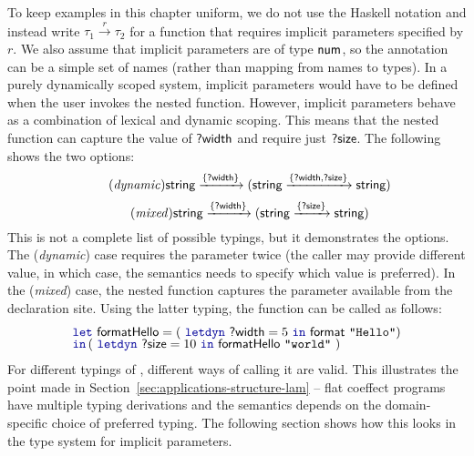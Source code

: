 To keep examples in this chapter uniform, we do not use the Haskell notation and instead
write $\tau_1 \xrightarrow{r} \tau_2$ for a function that requires implicit parameters specified by $r$.
We also assume that implicit parameters are of type $\textnormal{\sffamily num}$, so the annotation can be a
simple set of names (rather than mapping from names to types). In a purely dynamically scoped system,
implicit parameters would have to be defined when the user invokes the nested function.
However, implicit parameters behave as a combination of lexical and dynamic scoping. This means
that the nested function can capture the value of $\textnormal{\sffamily ?width}$ and require just $\textnormal{\sffamily ?size}$.
The following shows the two options:
%
\begin{equation}
\tag{\emph{dynamic}}
\ident{string} \xrightarrow{ \{ \ident{?width} \} }
  (\ident{string} \xrightarrow{ \{ \ident{?width}, \ident{?size} \} } \ident{string})
\end{equation}
\vspace{-1em}
\begin{equation}
\tag{\emph{mixed}}
\ident{string} \xrightarrow{ \{ \ident{?width} \} }
  (\ident{string} \xrightarrow{ \{ \ident{?size} \} } \ident{string})
\end{equation}
%
This is not a complete list of possible typings, but it demonstrates the options. The (\emph{dynamic})
case requires the parameter  twice (the caller may provide different value, in which
case, the semantics needs to specify which value is preferred). In the (\emph{mixed}) case, the
nested function captures the  parameter available from the declaration site. Using
the latter typing, the function can be called as follows:
%
\begin{equation*}
\begin{array}{l}
 \kvd{let}~\ident{formatHello} = (~\kvd{letdyn}~\ident{?width}=5~\kvd{in}~\ident{format}~\texttt{"Hello"})\\[-0.25em]
 \kvd{in}\,(~\kvd{letdyn}~\ident{?size} = 10~\kvd{in}~\ident{formatHello}~\texttt{"world"}~)
\end{array}
\end{equation*}
%
For different typings of , different ways of calling it are valid. This illustrates
the point made in Section~\ref{sec:applications-structure-lam} -- flat coeffect programs have
multiple typing derivations and the semantics depends on the domain-specific choice of preferred
typing. The following section shows how this looks in the type system for implicit parameters.

